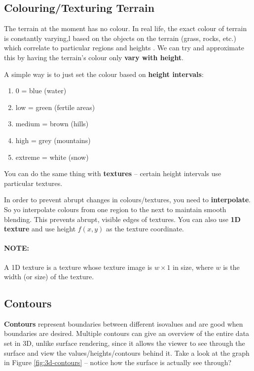 \documentclass{article}
\begin{document}
\subsection{Colouring/Texturing Terrain}

The terrain at the moment has no colour. In real life, the exact colour of terrain is constantly varying,l based on the objects on the terrain (grass, rocks, etc.) which correlate to particular regions and heights . We can try and approximate this by having the terrain's colour only \textbf{vary with height}.

A simple way is to just set the colour based on \textbf{height intervals}:
\begin{enumerate}
	\item 0 = blue (water)
	\item low = green (fertile areas)
	\item medium = brown (hills)
	\item high = grey (mountains)
	\item extreme = white (snow)
\end{enumerate}
You can do the same thing with \textbf{textures} -- certain height intervals use particular textures.

In order to prevent abrupt changes in colours/textures, you need to \textbf{interpolate}. So yo interpolate colours from one region to the next to maintain smooth blending. This prevents abrupt, visible edges of textures. You can also use \textbf{1D texture} and use height $f(x, y)$ as the texture coordinate.

\paragraph{\textbf{NOTE: }}A 1D texture is a texture whose texture image is $w \times 1$ in size, where $w$ is the width (or size) of the texture.
\paragraph{}

\subsection{Contours}

\textbf{Contours} represent boundaries between different isovalues and are good when boundaries are desired. Multiple contours can give an overview of the entire data set in 3D, unlike surface rendering, since it allows the viewer to see through the surface and view the values/heights/contours behind it. Take a look at the graph in Figure \ref{fig:3d-contours} – notice how the surface is actually see through?
\end{document}
